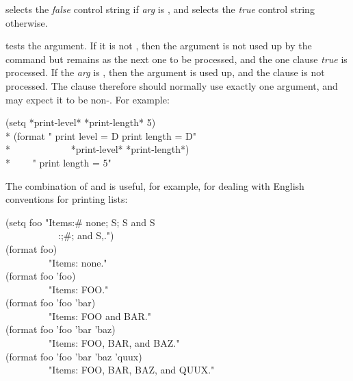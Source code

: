 \begin{flushdesc}
 selects the \emph{false} control string
if \emph{arg} is {\false}, and selects the \emph{true} control string otherwise.

 tests the argument.  If it is not {\false},
then the argument is not used up by the \cd{{\Xtilde}{\Xatsign}{\Xlbracket}} command
but remains as the next one to be processed,
and the one clause \emph{true} is processed.
If the \emph{arg} is {\false}, then the argument is used up,
and the clause is not processed.
The clause therefore should normally use exactly one argument,
and may expect it to be non-{\false}.
For example:
\begin{lisp}
(setq *print-level* {\false} *print-length* 5) \\*
(format {\false} "{\Xtilde}{\Xatsign}{\Xlbracket} print level = {\Xtilde}D{\Xtilde}{\Xrbracket}{\Xtilde}{\Xatsign}{\Xlbracket} print length = {\Xtilde}D{\Xtilde}{\Xrbracket}" \\*
~~~~~~~~~~~~*print-level* *print-length*) \\*
~~~\EV\  " print length = 5"
\end{lisp}

The combination of \cd{{\Xtilde}{\Xlbracket}} and \cd{\#} is useful, for
example, for dealing with English conventions for printing lists:
\begin{lisp}
(setq foo "Items:{\Xtilde}\#{\Xlbracket} none{\Xtilde}; {\Xtilde}S{\Xtilde}; {\Xtilde}S and {\Xtilde}S{\Xtilde} \\
~~~~~~~~~~~{\Xtilde}:;{\Xtilde}{\Xatsign}{\Xlbrace}{\Xtilde}\#{\Xlbracket}{\Xtilde}; and{\Xtilde}{\Xrbracket}
{\Xtilde}S{\Xtilde}{\Xcircumflex},{\Xtilde}{\Xrbrace}{\Xtilde}{\Xrbracket}.") \\
(format {\false} foo) \\ ~~~~~~~~\EV\  "Items: none." \\
(format {\false} foo 'foo) \\
~~~~~~~~\EV\  "Items: FOO." \\
(format {\false} foo 'foo 'bar) \\
~~~~~~~~\EV\  "Items: FOO and BAR." \\
(format {\false} foo 'foo 'bar 'baz) \\
~~~~~~~~\EV\  "Items: FOO, BAR, and BAZ." \\
(format {\false} foo 'foo 'bar 'baz 'quux) \\
~~~~~~~~\EV\  "Items: FOO, BAR, BAZ, and QUUX."
\end{lisp}


\end{flushdesc}

